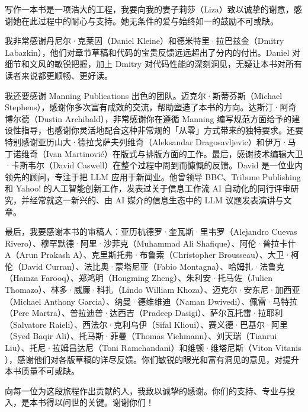 写作一本书是一项浩大的工程，我要向我的妻子莉莎（Liza）致以诚挚的谢意，感谢她在此过程中的耐心与支持。她无条件的爱与始终如一的鼓励不可或缺。

我非常感谢丹尼尔·克莱因（Daniel Kleine）和德米特里·拉巴兹金（Dmitry Labazkin），他们对章节草稿和代码的宝贵反馈远远超出了分内的付出。Daniel 对细节和文风的敏锐把握，加上 Dmitry 对代码性能的深刻洞见，无疑让本书对所有读者来说都更顺畅、更好读。

我还要感谢 Manning Publications 出色的团队。迈克尔·斯蒂芬斯（Michael Stephens），感谢你多次富有成效的交流，帮助塑造了本书的方向。达斯汀·阿奇博尔德（Dustin Archibald），非常感谢你在遵循 Manning 编写规范方面给予的建设性指导，也感谢你灵活地配合这种非常规的「从零」方式带来的独特要求。还要特别感谢亚历山大·德拉戈萨夫列维奇（Aleksandar Dragosavljevic）和伊万·马丁诺维奇（Ivan Martinović）在版式与排版方面的工作。最后，感谢技术编辑大卫·卡斯韦尔（David Caswell）在整个过程中周到而慷慨的反馈。David 是一位业内领先的顾问，专注于把 LLM 应用于新闻业。他曾领导 BBC、Tribune Publishing 和 Yahoo! 的人工智能创新工作，发表过关于信息工作流 AI 自动化的同行评审研究，并经常就这一新兴的、由 AI 媒介的信息生态中的 LLM 议题发表演讲与文章。

最后，我要感谢本书的审稿人：亚历杭德罗·奎瓦斯·里韦罗（Alejandro Cuevas Rivero）、穆罕默德·阿里·沙菲克（Muhammad Ali Shafique）、阿伦·普拉卡什 A（Arun Prakash A）、克里斯托弗·布鲁索（Christopher Brousseau）、大卫·柯伦（David Curran）、法比奥·蒙塔尼亚（Fabio Montagna）、哈姆扎·法鲁克（Hamza Farooq）、郑鸿明（Hongming Zheng）、朱利安·托马佐（Julien Thomazo）、林多·威廉·科扎（Lindo William Khoza）、迈克尔·安东尼·加西亚（Michael Anthony Garcia）、纳曼·德维维迪（Naman Dwivedi）、佩雷·马特拉（Pere Martra）、普拉迪普·达西吉（Pradeep Dasigi）、萨尔瓦托雷·拉耶利（Salvatore Raieli）、西法尔·克利乌伊（Sifal Klioui）、赛义德·巴基尔·阿里（Syed Baqir Ali）、托马斯·菲曼（Thomas Viehmann）、刘天瑞（Tianrui Liu）、托尼·拉姆昌达尼（Toni Ramchandani）和维顿·维塔尼斯（Viton Vitanis ），感谢他们对各版草稿的详尽反馈。你们敏锐的眼光和富有洞见的意见，对提升本书质量不可或缺。

向每一位为这段旅程作出贡献的人，我致以诚挚的感谢。你们的支持、专业与投入，是本书得以问世的关键。谢谢你们！
